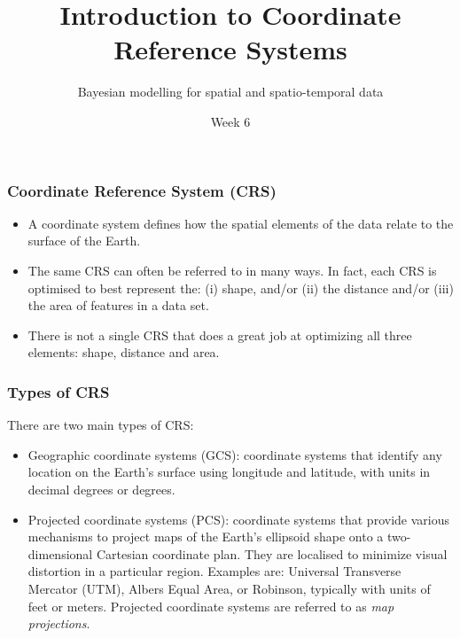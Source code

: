 \documentclass[11pt]{beamer}
\title{Introduction to Coordinate Reference Systems}
\subtitle{}
\author{Bayesian modelling for spatial and spatio-temporal data}
\institute{MSc in Epidemiology}
\date{Week 6}
\begin{document}
\begin{frame}[t]
  \titlepage
\end{frame}


\begin{frame}
\frametitle{Coordinate Reference System (CRS)}
\begin{itemize} \setlength\itemsep{\fill}
\item A coordinate system defines how the spatial elements of the data relate to the surface of the Earth.
\item The same CRS can often be referred to in many ways. In fact, each CRS is optimised to best represent the: (i) shape, and/or (ii) the distance and/or (iii) the area of features in a data set.
\item There is not a single CRS that does a great job at optimizing all three elements: shape, distance and area.
\end{itemize}
\end{frame}


\begin{frame}
\frametitle{Types of CRS}
There are two main types of CRS:
\begin{itemize} \setlength\itemsep{\fill}
\item  \alert{Geographic coordinate systems (GCS)}: coordinate systems that identify any location on the Earth's surface using longitude and latitude, with units in decimal degrees or degrees.
\item \alert{Projected coordinate systems (PCS)}: coordinate systems that provide various mechanisms to project maps of the Earth's ellipsoid shape onto a two-dimensional Cartesian coordinate plan. They are localised to minimize visual distortion in a particular region. Examples are: Universal Transverse Mercator (UTM), Albers Equal Area, or Robinson, typically with units of feet or meters. Projected coordinate systems are referred to as \emph{map projections}.
\end{itemize}
\vspace{15pt}
\end{frame}
\end{document}
